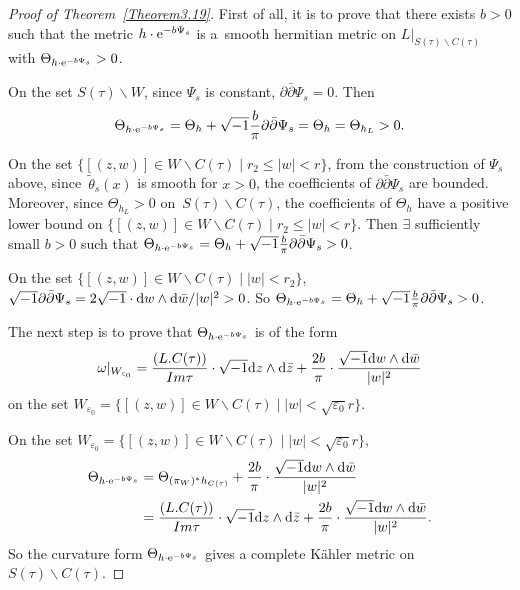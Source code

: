 \documentclass[10pt,a4paper]{amsart}
\numberwithin{equation}{section}
\def\operatorname#1{#1}
\begin{document}
\begin{proof}[Proof of Theorem~\ref{Theorem3.19}]
First of all, it is to prove that there exists $b>0$ such that the metric $h \cdot {\rm e}^{-b \Psi_s}$ is a~smooth hermitian metric on $L|_{S(\tau)\backslash C(\tau)}$ with $\Theta_{h \cdot {\rm e}^{-b \Psi_s}}>0$.

On the set $S(\tau)\backslash W$, since $\Psi_s$ is constant, $\partial \bar{\partial}\Psi_s=0$. Then
\[\Theta_{h \cdot {\rm e}^{-b \Psi_s}}=\Theta_h + \sqrt{-1} \frac{b}{\pi} \partial \bar{\partial} \Psi_s =\Theta_h=\Theta_{h_L}>0.\]

On the set $\{ [(z,w)]\in W\backslash C(\tau) \mid r_2 \leq |w|<r \}$, from the construction of $\Psi_s$ above, since~$\widetilde{\theta}_s(x)$ is smooth for $x>0$, the coefficients of $\partial \bar{\partial}\Psi_s$ are bounded. Moreover, since $\Theta_{h_L}>0$ on~$S(\tau)\backslash C(\tau)$, the coefficients of $\Theta_h$ have a positive lower bound on $\{ [(z,w)]\in W\backslash C(\tau) \mid r_2 \leq |w|<r \}$. Then $\exists$ sufficiently small $b>0$ such that $\Theta_{h \cdot {\rm e}^{-b \Psi_s}}=\Theta_h + \sqrt{-1} \frac{b}{\pi}\partial \bar{\partial} \Psi_s >0$.

On the set $\{ [(z,w)]\in W\backslash C(\tau) \mid |w|<r_2 \}$,
$\sqrt{-1} \partial \bar{\partial} \Psi_s=2 \sqrt{-1} \cdot {\rm d}w \wedge {\rm d}\bar{w} /|w|^2>0$.
So $\Theta_{h \cdot {\rm e}^{-b \Psi_s}}=\Theta_h + \sqrt{-1} \frac{b}{\pi}\partial \bar{\partial} \Psi_s >0$.

The next step is to prove that $\Theta_{h \cdot {\rm e}^{-b \Psi_s}}$ is of the form
\[
\omega|_{W_{\varepsilon_0}}=\frac{ (L.C(\tau))}{\operatorname{ Im}\tau}\cdot \sqrt{-1} {\rm d}z \wedge {\rm d} \bar{z}+\frac{2b}{\pi} \cdot \frac{\sqrt{-1}{\rm d}w \wedge {\rm d} \bar{w}}{|w|^2}
\]
on the set $W_{\varepsilon_0}=\{[(z,w)]\in W \backslash C(\tau)\mid |w|<\sqrt{\varepsilon_0}r\}$.

On the set $W_{\varepsilon_0}=\{[(z,w)]\in W \backslash C(\tau)\mid |w|<\sqrt{\varepsilon_0}r\}$,
\begin{align*}
\Theta_{h \cdot {\rm e}^{-b \Psi_s}}&=\Theta_{(\pi_W)^*h_{C(\tau)}}+\frac{2b}{\pi}\cdot \frac{\sqrt{-1}{\rm d}w \wedge {\rm d} \bar{w}}{|w|^2}\\
&=\frac{(L.C(\tau))}{\operatorname{ Im}\tau}\cdot \sqrt{-1} {\rm d}z \wedge {\rm d} \bar{z}+\frac{2b}{\pi}\cdot \frac{\sqrt{-1}{\rm d}w \wedge {\rm d} \bar{w}}{|w|^2}.
\end{align*}
 So the curvature form $\Theta_{h \cdot {\rm e}^{-b\Psi_s}}$ gives a complete K\"ahler metric on $S(\tau)\backslash C(\tau)$.


\end{proof}
\end{document}
